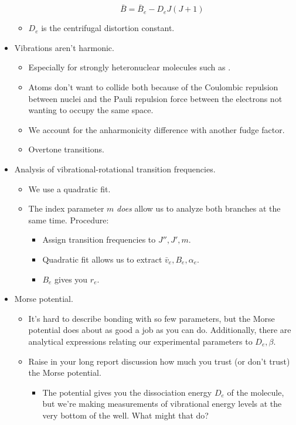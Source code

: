 \documentclass[../notes.tex]{subfiles}
\begin{document}
\begin{itemize}
\begin{itemize}
        \begin{equation*}
            \bar{B} = \bar{B}_e-D_eJ(J+1)
        \end{equation*}
        \item $D_e$ is the centrifugal distortion constant.
    \end{itemize}
    \item Vibrations aren't harmonic.
    \begin{itemize}
        \item Especially for strongly heteronuclear molecules such as .
        \item Atoms don't want to collide both because of the Coulombic repulsion between nuclei and the Pauli repulsion force between the electrons not wanting to occupy the same space.
        \item We account for the anharmonicity difference with another fudge factor.
        \item Overtone transitions.
    \end{itemize}
    \item Analysis of vibrational-rotational transition frequencies.
    \begin{itemize}
        \item We use a quadratic fit.
        \item The index parameter $m$ \emph{does} allow us to analyze both branches at the same time. Procedure:
        \begin{itemize}
            \item Assign transition frequencies to $J'',J',m$.
            \item Quadratic fit allows us to extract $\bar{v}_e,B_e,\alpha_e$.
            \item $B_e$ gives you $r_e$.
        \end{itemize}
    \end{itemize}
    \item Morse potential.
    \begin{itemize}
        \item It's hard to describe bonding with so few parameters, but the Morse potential does about as good a job as you can do. Additionally, there are analytical expressions relating our experimental parameters to $D_e,\beta$.
        \item Raise in your long report discussion how much you trust (or don't trust) the Morse potential.
        \begin{itemize}
            \item The potential gives you the dissociation energy $D_e$ of the molecule, but we're making measurements of vibrational energy levels at the very bottom of the well. What might that do?

\end{itemize}
\end{itemize}
\end{itemize}
\end{document}
